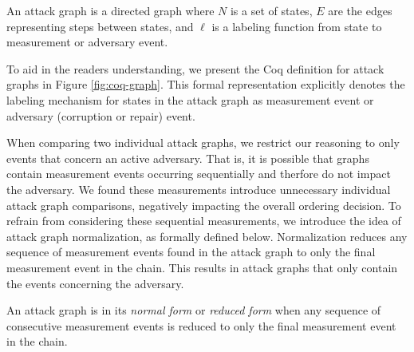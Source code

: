 \documentclass[runningheads]{llncs}
\theoremstyle{definition}
\begin{document}
\begin{definition}
    An attack graph is a directed graph where $N$ is a set of states, $E$ are the edges representing steps between states, and $\ell$ is a labeling function from state to measurement or adversary event. 
\end{definition}

\noindent To aid in the readers understanding, we present the Coq definition for attack graphs in Figure \ref{fig:coq-graph}. This formal representation explicitly denotes the labeling mechanism for states in the attack graph as measurement event or adversary (corruption or repair) event. 


When comparing two individual attack graphs, we restrict our reasoning to only events that concern an active adversary. That is, it is possible that graphs contain measurement events occurring sequentially and therfore do not impact the adversary. We found these measurements introduce unnecessary individual attack graph comparisons, negatively impacting the overall ordering decision. To refrain from considering these sequential measurements, we introduce the idea of attack graph normalization, as formally defined below. Normalization reduces any sequence of measurement events found in the attack graph to only the final measurement event in the chain. This results in attack graphs that only contain the events concerning the adversary. 

\begin{definition}
    An attack graph is in its \emph{normal form} or \emph{reduced form} when any sequence of consecutive measurement events is reduced to only the final measurement event in the chain. 
\end{definition}
\end{document}
